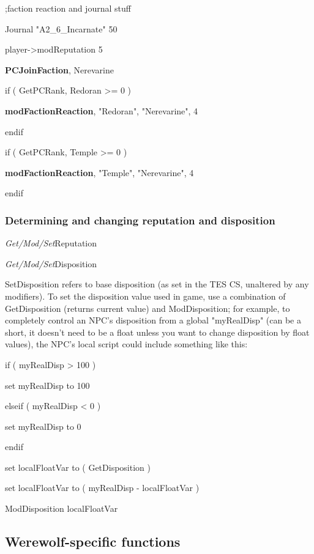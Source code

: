 \documentclass[
]{article}
\begin{document}
;faction reaction and journal stuff

Journal "A2\_6\_Incarnate" 50

player-\textgreater modReputation 5

\textbf{PCJoinFaction}, Nerevarine

if ( GetPCRank, Redoran \textgreater= 0 )

\textbf{modFactionReaction}, "Redoran", "Nerevarine", 4

endif

if ( GetPCRank, Temple \textgreater= 0 )

\textbf{modFactionReaction}, "Temple", "Nerevarine", 4

endif

\hypertarget{determining-and-changing-reputation-and-disposition}{%
\subsubsection{Determining and changing reputation and
disposition}\label{determining-and-changing-reputation-and-disposition}}

\emph{Get/Mod/Set}Reputation

\emph{Get/Mod/Set}Disposition

SetDisposition refers to base disposition (as set in the TES CS,
unaltered by any modifiers). To set the disposition value used in game,
use a combination of GetDisposition (returns current value) and
ModDisposition; for example, to completely control an NPC's disposition
from a global "myRealDisp" (can be a short, it doesn't need to be a
float unless you want to change disposition by float values), the NPC's
local script could include something like this:

if ( myRealDisp \textgreater{} 100 )

set myRealDisp to 100

elseif ( myRealDisp \textless{} 0 )

set myRealDisp to 0

endif

set localFloatVar to ( GetDisposition )

set localFloatVar to ( myRealDisp - localFloatVar )

ModDisposition localFloatVar

\emph{\hfill\break
}

\hypertarget{werewolf-specific-functions}{%
\subsection{Werewolf-specific
functions}\label{werewolf-specific-functions}}
\end{document}
